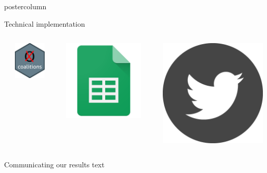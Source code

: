 \documentclass[final,hyperref={pdfpagelabels=false}]{beamer}
\newcommand*\circled[1]{\tikz[baseline=(char.base)]{
\node[shape=circle,draw,inner sep=2pt] (char) {#1};}}
\begin{document}
\begin{frame}
\begin{columns}
\begin{column}{1\textwidth}
\begin{columns}[T]
\begin{column}{.484\textwidth}
\begin{beamercolorbox}[center,wd=\textwidth]{postercolumn}
\begin{minipage}[T]{.95\textwidth}
\begin{block}{\footnotesize \circled{3} Technical implementation}
\begin{columns}[t]
  \hspace{-1.5ex}
  \textcolor{LMUlightgray}{\vrule{}}
  \hspace{1.5ex}

  \begin{column}{.15\textwidth}
  \begin{center}
  \includegraphics[height=5ex]{figures/implementation_coalitions}
  \end{center}
  \end{column}

  \hspace{-1.5ex}
  \textcolor{LMUlightgray}{\vrule{}}
  \hspace{1.5ex}

  \begin{column}{.15\textwidth}
  \begin{center}
  \includegraphics[height=5ex]{figures/implementation_sheets}
  \end{center}
  \end{column}

  \hspace{-1.5ex}
  \textcolor{LMUlightgray}{\vrule{}}
  \hspace{1.5ex}

  \begin{column}{.15\textwidth}
  \begin{center}
  \includegraphics[height=5ex]{figures/implementation_twitter}
  \end{center}
  \end{column}
\end{columns}
\end{block}

\begin{block}{\footnotesize \circled{4} Communicating our results}
text
\end{block}


\end{minipage}
\end{beamercolorbox}
\end{column}


\end{columns}
\end{column}
\end{columns}
\end{frame}
\end{document}
